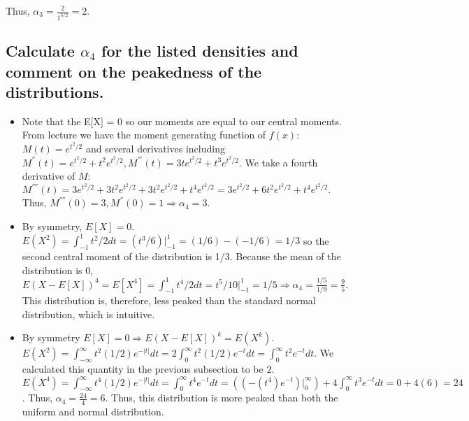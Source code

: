 \documentclass[11pt]{article} %
\begin{document}
Thus, $\alpha_3 = \frac{2}{1^{3/2}} = 2.$

\subsection{Calculate $\alpha_4$ for the listed densities and comment on the peakedness of the distributions.}
\begin{itemize}
\item Note that the E[X] = 0 so our moments are equal to our central moments. From lecture we have the moment generating function of $f(x)$: $M(t) = e^{t^2/2}$ and several derivatives including $M^{''}(t) = e^{t^2/2} + t^2 e^{t^2/2}, M^{'''}(t) = 3t e^{t^2/2} + t^3e^{t^2/2}.$ We take a fourth derivative of $M$: $ M^{''''}(t) = 3e^{t^2/2} + 3t^2e^{t^2/2} + 3t^2e^{t^2/2} + t^4 e^{t^2/2} =  3e^{t^2/2} +  6t^2e^{t^2/2} + t^4 e^{t^2/2}.$ Thus, $M^{''''}(0) = 3, M^{''}(0) = 1 \Rightarrow \alpha_4 = 3.$ 
\item By symmetry, $E[X] = 0.$ $E(X^2) = \int_{-1}^{1} t^2/2dt = (t^3/6)|_{-1}^{1} = (1/6) -(-1/6) = 1/3$ so the second central moment of the distribution is 1/3. Because the mean of the distribution is 0, $E(X-E[X])^4 = E[X^4] = \int_{-1}^1 t^4/2 dt = t^5/10|_{-1}^{1} = 1/5 \Rightarrow \alpha_4 = \frac{1/5}{1/9} = \frac{9}{5}.$ This distribution is, therefore, less peaked than the standard normal distribution, which is intuitive.
\item By symmetry $E[X] = 0 \Rightarrow E(X-E[X])^k = E(X^k).$ $E(X^2) = \int_{-\infty}^{\infty}t^2(1/2)e^{-|t|}dt = 2\int_{0}^{\infty}t^2(1/2)e^{-t}dt =  \int_{0}^{\infty}t^2e^{-t}dt.$ We calculated this quantity in the previous subsection to be $2$.  $E(X^4) = \int_{-\infty}^{\infty}t^4(1/2)e^{-|t|}dt = \int_{0}^{\infty}t^4e^{-t}dt = ((-(t^4) e^{-t})|_{0}^{\infty}) + 4\int_{0}^{\infty} t^3e^{-t}dt = 0 + 4(6)  =24$. Thus, $\alpha_4 = \frac{24}{4} = 6.$ Thus, this distribution is more peaked than both the uniform and normal distribution.
\end{itemize}
\end{document}
